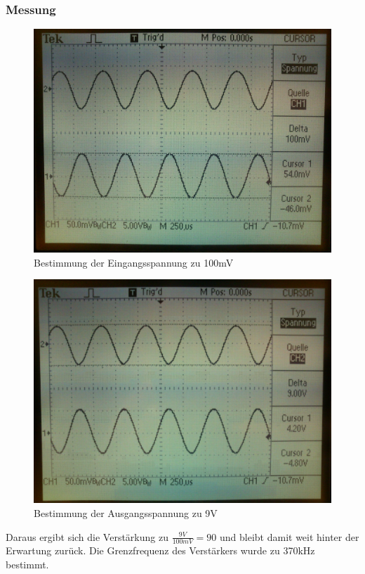 \subsubsection*{Messung}
\begin{figure}[H]
	\centering
	\includegraphics[width=\linewidth]{versuch5/oszi/DSC_0451.JPG}
	\caption{Bestimmung der Eingangsspannung zu 100mV}
\end{figure}
\begin{figure}[H]
	\centering
	\includegraphics[width=\linewidth]{versuch5/oszi/DSC_0453.JPG}
	\caption{Bestimmung der Ausgangsspannung zu 9V}
\end{figure}
Daraus ergibt sich die Verstärkung zu $\frac{9V}{100mV}=90$ und bleibt damit weit hinter der Erwartung zurück. Die Grenzfrequenz des Verstärkers wurde zu 370kHz bestimmt.
